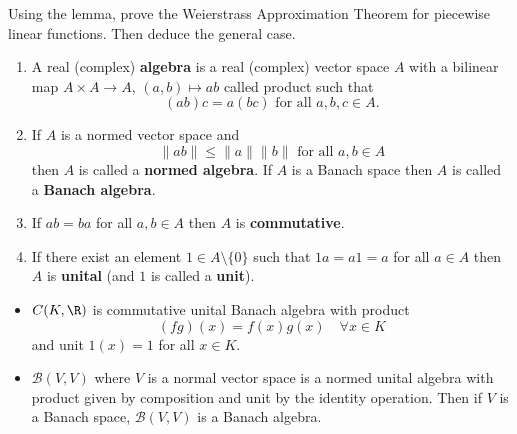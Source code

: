 \documentclass{article}
\begin{document}
\begin{ex}
    Using the lemma, prove the Weierstrass Approximation Theorem for piecewise linear functions. Then deduce the general case.
\end{ex}

\begin{defi}
    \begin{enumerate}[label=(\roman*)]
        \item A real (complex) \textbf{algebra} is a real (complex) vector space $A$ with a bilinear map $A \times A \to A$, $(a, b) \mapsto ab$ called product such that
            \begin{equation*}
                (ab)c = a(bc) \text{ for all } a, b, c \in A \tag{(associativity)}.
            \end{equation*}
        \item If $A$ is a normed vector space and
            \begin{equation*}
                \|ab\| \leq \|a\| \|b\| \text{ for all } a, b \in A
            \end{equation*}
            then $A$ is called a \textbf{normed algebra}.
            If $A$ is a Banach space then $A$ is called a \textbf{Banach algebra}.
        \item If $ab=ba$ for all $a,b  \in A$ then $A$ is \textbf{commutative}.
        \item If there exist an element $1 \in A \setminus \{0\}$ such that $1a =a1=a$ for all $a \in A$ then $A$ is \textbf{unital} (and $1$ is called a \textbf{unit}).
    \end{enumerate}
\end{defi}

\begin{eg}
    \begin{itemize}
        \item $C(K, \R)$ is commutative unital Banach algebra with product
            \begin{equation*}
                (fg)(x) = f(x) g(x) \quad \forall x \in K
            \end{equation*}
            and unit $1(x) = 1$ for all $x \in K$.
        \item $\mathcal{B}(V, V)$ where $V$ is a normal vector space is a normed unital algebra with product given by composition and unit by the identity operation.
            Then if $V$ is a Banach space, $\mathcal{B}(V, V)$ is a Banach algebra.
    \end{itemize}
\end{eg}
\end{document}
